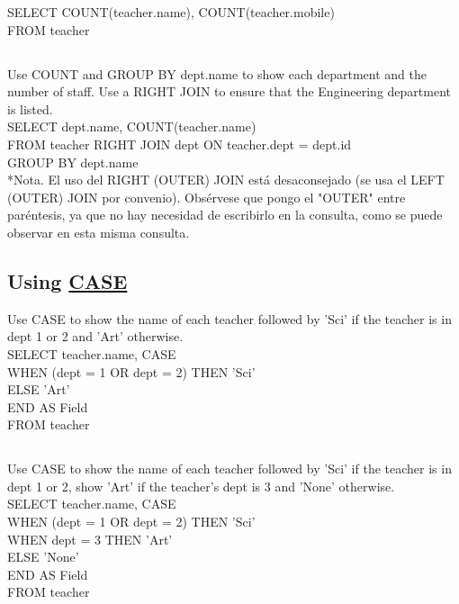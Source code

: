 \documentclass[10pt, oneside]{article}
\begin{document}
SELECT COUNT(teacher.name), COUNT(teacher.mobile)\\
FROM teacher\\

\subsection{}

Use COUNT and GROUP BY dept.name to show each department and the number of staff. Use a RIGHT JOIN to ensure that the Engineering department is listed.\\

SELECT dept.name, COUNT(teacher.name)\\
FROM teacher RIGHT JOIN dept ON teacher.dept = dept.id\\
GROUP BY dept.name\\

\color{blue}*Nota. \color{black}El uso del RIGHT (OUTER) JOIN está desaconsejado (se usa el LEFT (OUTER) JOIN por convenio). Obsérvese que pongo el "OUTER" entre paréntesis, ya que no hay necesidad de escribirlo en la consulta, como se puede observar en esta misma consulta.\\

\subsection{Using \hyperref{https://sqlzoo.net/wiki/CASE}{}{}{CASE}}

Use CASE to show the name of each teacher followed by 'Sci' if the teacher is in dept 1 or 2 and 'Art' otherwise.\\

SELECT teacher.name, CASE \\
WHEN (dept = 1 OR dept = 2) THEN 'Sci'\\
ELSE 'Art'\\
END AS Field\\
FROM teacher\\

\subsection{}

Use CASE to show the name of each teacher followed by 'Sci' if the teacher is in dept 1 or 2, show 'Art' if the teacher's dept is 3 and 'None' otherwise.\\

SELECT teacher.name, CASE \\
WHEN (dept = 1 OR dept = 2) THEN 'Sci'\\
WHEN dept = 3 THEN 'Art'\\
ELSE 'None'\\
END AS Field\\
FROM teacher\\
\end{document}
